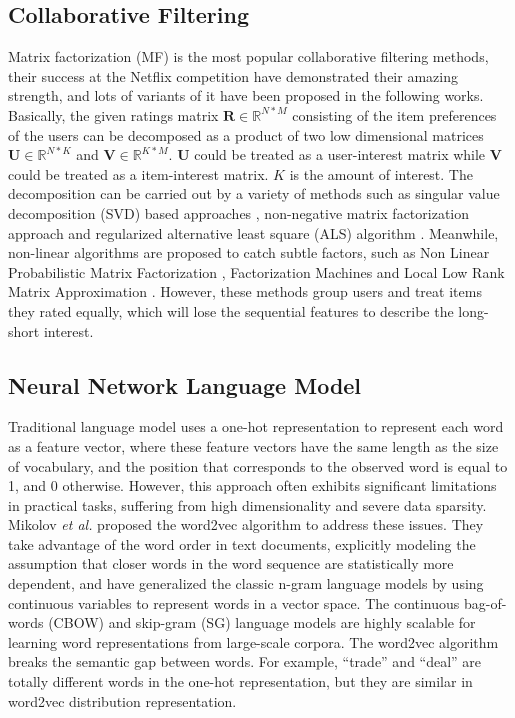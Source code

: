 \documentclass{llncs}
\begin{document}
\subsection{Collaborative Filtering}
Matrix factorization (MF) is the most popular collaborative filtering methods,
their success at the Netflix competition \cite{koren2009matrix}
have demonstrated their amazing strength,
and lots of variants of it have been proposed in the following works.
Basically, the given ratings matrix $\mathbf{R} \in \mathbb{R}^{N*M}$
consisting of the item preferences of the users can be decomposed as
a product of two low dimensional matrices $\mathbf{U} \in \mathbb{R}^{N*K}$
and $\mathbf{V} \in \mathbb{R}^{K*M}$.
$\mathbf{U}$ could be treated as a user-interest matrix while
$\mathbf{V}$ could be treated as a item-interest matrix.
$K$ is the amount of interest.
The decomposition can be carried out by a variety of methods
such as singular value decomposition (SVD) based approaches \cite{mazumder2010spectral},
non-negative matrix factorization approach \cite{lee2001algorithms}
and regularized alternative least square (ALS) algorithm \cite{zhou2008large}.
Meanwhile, non-linear algorithms are proposed to catch subtle factors,
such as Non Linear Probabilistic Matrix Factorization \cite{lawrence2009non},
Factorization Machines \cite{rendle2010factorization} and
Local Low Rank Matrix Approximation \cite{lee2013local}.
However, these methods group users and treat items they rated equally,
which will lose the sequential features to describe the long-short interest.

\subsection{Neural Network Language Model}
Traditional language model uses a one-hot representation to represent each word
as a feature vector, where these feature vectors have the same length as the size
of vocabulary, and the position that corresponds to the observed word is equal to 1,
and 0 otherwise. However, this approach often exhibits significant limitations
in practical tasks, suffering from high dimensionality and severe data sparsity.
Mikolov \textit{et al.} \cite{mikolov2013efficient} proposed
the word2vec algorithm to address these issues. They take advantage of the word order
in text documents, explicitly modeling the assumption that closer words in the word
sequence are statistically more dependent, and have generalized the classic n-gram
language models by using continuous variables to represent words in a vector space.
The continuous bag-of-words (CBOW) and skip-gram (SG) language models are highly
scalable for learning word representations from large-scale corpora.
The word2vec algorithm breaks the semantic gap between words.
For example, ``trade'' and ``deal'' are totally different words in the one-hot representation,
but they are similar in word2vec distribution representation.
\end{document}
